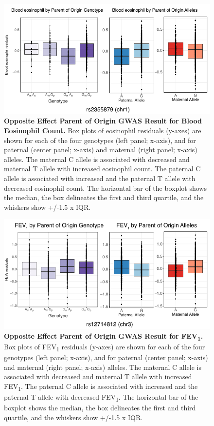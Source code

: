 \begin{figure}[!htb]
\centering
\includegraphics[width=5in]{img/ch02/fig-s12.pdf}
\caption[Opposite Effect Parent of Origin GWAS Result for Blood Eosinophil Count.]{\textbf{Opposite Effect Parent of Origin GWAS Result for Blood Eosinophil Count.}  Box plots of eosinophil residuals (y-axes) are shown for each of the four genotypes (left panel; x-axis), and for paternal (center panel; x-axis) and maternal (right panel; x-axis) alleles. The maternal C allele is associated with decreased and maternal T allele with increased eosinophil count. The paternal C allele is associated with increased and the paternal T allele with decreased eosinophil count. The horizontal bar of the boxplot shows the median, the box delineates the first and third quartile, and the whiskers show +/-1.5 x IQR.}
\label{fig:fig-s12}
\end{figure}

\begin{figure}[!htb]
\centering
\includegraphics[width=5in]{img/ch02/fig-s13.pdf}
\caption[Opposite Effect Parent of Origin GWAS Result for FEV\textsubscript{1}.]{\textbf{Opposite Effect Parent of Origin GWAS Result for FEV\textsubscript{1}.} Box plots of FEV\textsubscript{1} residuals (y-axes) are shown for each of the four genotypes (left panel; x-axis), and for paternal (center panel; x-axis) and maternal (right panel; x-axis) alleles. The maternal C allele is associated with decreased and maternal T allele with increased FEV\textsubscript{1}. The paternal C allele is associated with increased and the paternal T allele with decreased FEV\textsubscript{1}. The horizontal bar of the boxplot shows the median, the box delineates the first and third quartile, and the whiskers show +/-1.5 x IQR.}
\label{fig:fig-s13}
\end{figure}

